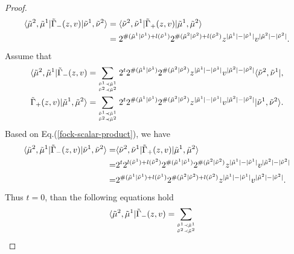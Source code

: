 \documentclass[11pt,reqno]{amsart}
\numberwithin{equation}{section}
\begin{document}
\begin{proof}
		\begin{align}
			\langle \tilde{\mu}^2,\tilde{\mu}^1|\tilde{\Gamma}_-(z,v) |\tilde{\nu}^1,\tilde{\nu}^2 \rangle
			&=
			\langle \tilde{\nu}^2,\tilde{\nu}^1|\tilde{\Gamma}_+(z,v)|\tilde{\mu}^1,\tilde{\mu}^2 \rangle\notag\\
			&=	
			2^{\#(\tilde{\mu}^{1}|\tilde{\nu}^{1})+l(\tilde{\nu}^{1})}
			2^{\#(\tilde{\mu}^{2}|\tilde{\nu}^{2}) +l(\tilde{\nu}^{2})}
			z^{|\tilde{\mu}^{1}| - |\tilde{\nu}^{1}|} v^{|\tilde{\mu}^{2}| - |\tilde{\nu}^{2}|}.
		\end{align}
		Assume that
		\begin{align}
			\langle \tilde{\mu}^2,\tilde{\mu}^1|\tilde{\Gamma}_-(z,v)
			=&\sum_{{\tilde{\nu}^1 \prec \tilde{\mu}^1}	\atop{\tilde{\nu}^2 \prec \tilde{\mu}^2}}
			2^{t}2^{\#(\tilde{\mu}^{1}|\tilde{\nu}^{1})}
			2^{\#(\tilde{\mu}^{2}|\tilde{\nu}^{2}) }
			z^{|\tilde{\mu}^{1}| - |\tilde{\nu}^{1}|} v^{|\tilde{\mu}^{2}| - |\tilde{\nu}^{2}|}\langle \tilde{\nu}^2,\tilde{\nu}^1|,\\
			\tilde{\Gamma}_+(z,v)|\tilde{\mu}^1,\tilde{\mu}^2 \rangle
			=&\sum_{{\tilde{\nu}^1 \prec \tilde{\mu}^1}	\atop{\tilde{\nu}^2 \prec \tilde{\mu}^2}}
			2^{t}2^{\#(\tilde{\mu}^{1}|\tilde{\nu}^{1})}
			2^{\#(\tilde{\mu}^{2}|\tilde{\nu}^{2}) }
			z^{|\tilde{\mu}^{1}| - |\tilde{\nu}^{1}|} v^{|\tilde{\mu}^{2}| - |\tilde{\nu}^{2}|}|\tilde{\nu}^1,\tilde{\nu}^2 \rangle .
		\end{align}
		Based on Eq.(\ref{fock-scalar-product}), we have
		\begin{align}
			\langle \tilde{\mu}^2,\tilde{\mu}^1|\tilde{\Gamma}_-(z,v) |\tilde{\nu}^1,\tilde{\nu}^2 \rangle
			=&\langle \tilde{\nu}^2,\tilde{\nu}^1|\tilde{\Gamma}_+(z,v)|\tilde{\mu}^1,\tilde{\mu}^2 \rangle\notag\\
			=&
			2^{t} 2^{l(\tilde{\nu}^{1})+l(\tilde{\nu}^{2})}
			2^{\#(\tilde{\mu}^{1}|\tilde{\nu}^{1})}
			2^{\#(\tilde{\mu}^{2}|\tilde{\nu}^{2}) }
			z^{|\tilde{\mu}^{1}| - |\tilde{\nu}^{1}|} v^{|\tilde{\mu}^{2}| - |\tilde{\nu}^{2}|}\notag\\
			=&
			2^{\#(\tilde{\mu}^{1}|\tilde{\nu}^{1})+l(\tilde{\nu}^{1})}
			2^{\#(\tilde{\mu}^{2}|\tilde{\nu}^{2}) +l(\tilde{\nu}^{2})}
			z^{|\tilde{\mu}^{1}| - |\tilde{\nu}^{1}|} v^{|\tilde{\mu}^{2}| - |\tilde{\nu}^{2}|}.
		\end{align}
		Thus $t=0$, than the following equations hold
		\begin{align}
			\langle \tilde{\mu}^2,\tilde{\mu}^1|\tilde{\Gamma}_-(z,v)
			=&\sum_{{\tilde{\nu}^1 \prec \tilde{\mu}^1}	\atop{\tilde{\nu}^2 \prec \tilde{\mu}^2}}

\end{align}
\end{proof}
\end{document}
